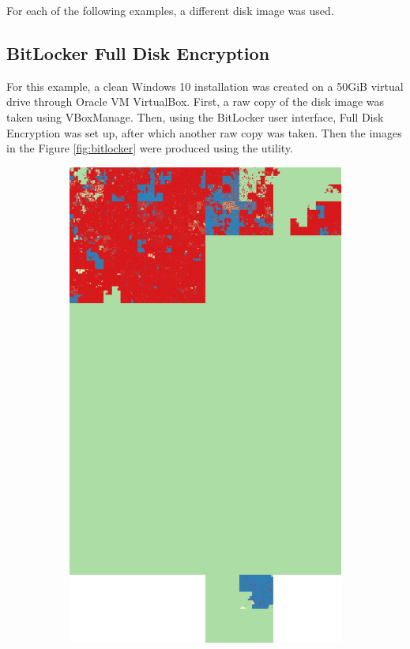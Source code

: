 \documentclass[
  digital, %
  color,   %
  oneside, %
  lof,     %
  nolot,     %
]{fithesis4}
\begin{document}
For each of the following examples, a different disk image was used.

\subsection{BitLocker Full Disk Encryption}
\label{ssec:bitlocker-full-disk-encryption}

For this example, a clean Windows 10 installation was created on a 50GiB virtual drive through Oracle VM VirtualBox.
First, a raw copy of the disk image was taken using VBoxManage.
Then, using the BitLocker user interface, Full Disk Encryption was set up, after which another raw copy was taken.
Then the images in the Figure \ref{fig:bitlocker} were produced using the utility.

\begin{figure}
  \centering
  \begin{subfigure}[t]{.45\textwidth}
    \centering
    \includegraphics[width=\textwidth,interpolate=false]{win-unencrypted-chi2-4-hilbert.png}

\end{subfigure}
\end{figure}
\end{document}
